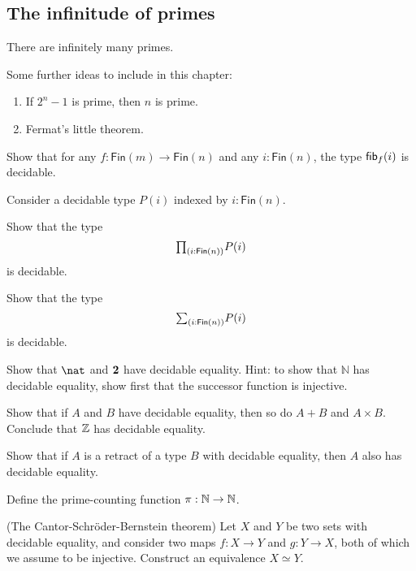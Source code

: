 \subsection{The infinitude of primes}

\begin{thm}
  There are infinitely many primes.
\end{thm}

Some further ideas to include in this chapter:
\begin{enumerate}
\item If $2^n-1$ is prime, then $n$ is prime.
\item Fermat's little theorem.
\end{enumerate}

\begin{exercises}
\item Show that for any $f:\mathsf{Fin}(m)\to\mathsf{Fin}(n)$ and any $i:\mathsf{Fin}(n)$, the type $\mathsf{fib}_{f}(i)$ is decidable.
\item Consider a decidable type $P(i)$ indexed by $i:\mathsf{Fin}(n)$.
  \begin{subexenum}
  \item Show that the type
    \begin{equation*}
      \prd{i:\mathsf{Fin}(n)}P(i)
    \end{equation*}
    is decidable.
  \item Show that the type
    \begin{equation*}
      \sm{i:\mathsf{Fin}(n)}P(i)
    \end{equation*}
    is decidable.
  \end{subexenum}
\item
  \begin{subexenum}
  \item Show that $\nat$ and $\mathbf{2}$ have decidable equality. Hint: to show that $\mathbb{N}$ has decidable equality, show first that the successor function is injective.
  \item Show that if $A$ and $B$ have decidable equality, then so do $A+B$ and $A\times B$. Conclude that ${\mathbb{Z}}$ has decidable equality.
  \item Show that if $A$ is a retract of a type $B$ with decidable equality, then $A$ also has decidable equality.
  \end{subexenum}
\item Define the prime-counting function $\pi:{\mathbb{N}}\to{\mathbb{N}}$.
\item (The Cantor-Schr\"oder-Bernstein theorem) Let $X$ and $Y$ be two sets with decidable equality, and consider two maps $f:X\to Y$ and $g:Y\to X$, both of which we assume to be injective. Construct an equivalence $X\simeq Y$.

\end{exercises}
